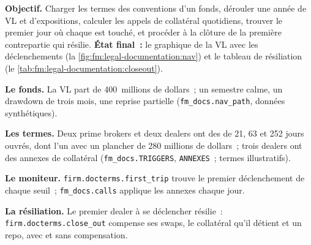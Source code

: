 \begin{tutorial}
\textbf{Objectif.} Charger les termes des conventions d'un fonds, dérouler une année de VL et d'expositions, calculer les appels de collatéral quotidiens, trouver le premier jour où chaque
 est touché, et procéder à la clôture de la première contrepartie qui résilie. \textbf{État final~:} le graphique de la VL avec les déclenchements
(la \cref{fig:fm:legal-documentation:nav}) et le tableau de résiliation (le \cref{tab:fm:legal-documentation:closeout}).
\begin{tutsteps}
\item \textbf{Le fonds.} La VL part de 400~millions de dollars~; un semestre calme, un drawdown de trois mois, une reprise partielle
(\texttt{fm\_docs.nav\_path}, données synthétiques).
\item \textbf{Les termes.} Deux prime brokers et deux dealers ont des  de 21, 63 et 252 jours ouvrés, dont l'un avec un plancher de 280
millions de dollars~; trois dealers ont des annexes de collatéral (\texttt{fm\_docs.TRIGGERS}, \texttt{ANNEXES}~; termes illustratifs).
\item \textbf{Le moniteur.} \texttt{firm.docterms.first\_trip} trouve le premier déclenchement de chaque seuil~; \texttt{fm\_docs.calls} applique les annexes chaque jour.
\item \textbf{La résiliation.} Le premier dealer à se déclencher résilie~: \texttt{firm.docterms.close\_out} compense ses swaps, le collatéral qu'il détient et un
repo, avec et sans compensation.
\end{tutsteps}
\end{tutorial}

